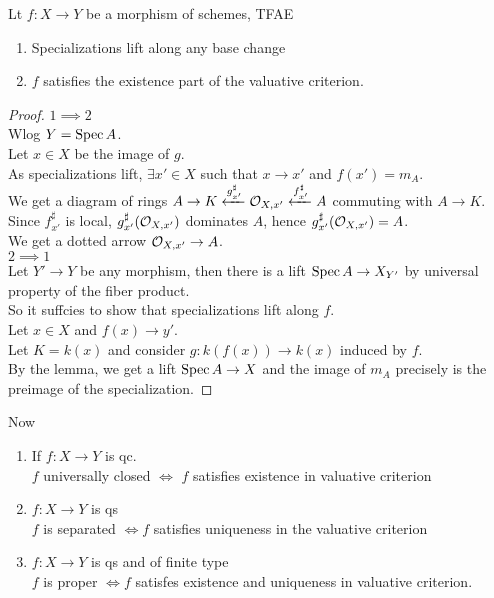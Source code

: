 \documentclass[../main.tex]{subfiles}
\begin{document}
\begin{thm}
	Lt $f:X\to Y$ be a morphism of schemes, TFAE
	\begin{enumerate}
	\item Specializations lift along any base change
	\item $f$ satisfies the existence part of the valuative criterion.
	\end{enumerate}
\end{thm}
\begin{proof}
$1\implies 2$ \\
Wlog $Y = \operatorname{Spec} A$.\\
Let $x\in X$ be the image of $g$.\\
As specializations lift, $\exists x' \in X$ such that $x\to x'$ and $f( x' ) = m_A$.\\
We get a diagram of rings $A\to K \xleftarrow{g_{x'}^{\sharp} } \mathcal{O}_{X,x'} \xleftarrow{f_{x'}^{\sharp}} A$ commuting with $A\to K$.\\
Since $f_{x'}^{\sharp}$ is local, $g_{x'} ^{\sharp}( \mathcal{O}_{X,x'} ) $ dominates $A$, hence $g_{x'} ^{\sharp}( \mathcal{O}_{X,x'} ) = A$.\\
We get a dotted arrow $\mathcal{O}_{X,x'} \to A$.\\
$2\implies 1$ \\
Let $Y' \to Y$ be any morphism, then there is a lift $\operatorname{Spec} A \to X_{Y'} $ by universal property of the fiber product.\\
So it suffcies to show that specializations lift along $f$.\\
Let $x\in X$ and $f( x) \to y'$.\\
Let $K = k( x) $ and consider $g: k( f( x) ) \to k( x) $ induced by $f$.\\
By the lemma, we get a lift $\operatorname{Spec} A \to X$ and the image of $m_A$ precisely is the preimage of the specialization.
\end{proof}
Now
\begin{enumerate}
\item If $f:X\to Y$ is qc. \\
	$f$ universally closed $\iff$ $f$ satisfies existence in valuative criterion
\item $f:X\to Y$ is qs\\
	$f$ is separated $\iff f$ satisfies uniqueness in the valuative criterion
\item $f:X\to Y$ is qs and of finite type\\
	$f$ is proper $\iff f$ satisfes existence and uniqueness in valuative criterion.
\end{enumerate}
\end{document}
